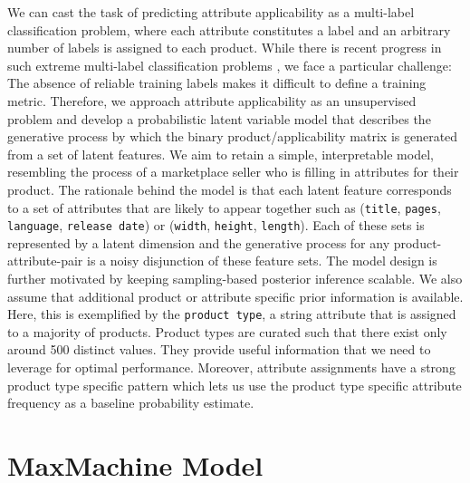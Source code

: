 \documentclass{article}
\begin{document}
We can cast the task of predicting attribute applicability as a
multi-label classification problem, 
where each attribute constitutes a label and an arbitrary number 
of labels is assigned to each product. While there is recent progress
in such extreme multi-label classification problems
\cite{Bhatia2015,Jain2017}, we face a particular challenge:
The absence of reliable training labels makes it difficult to
define a training metric. Therefore, we approach attribute
applicability as an unsupervised problem and develop a probabilistic
latent variable model
that describes the generative process by which the binary
product/applicability matrix is generated from a set of latent
features. We aim to retain a simple,
interpretable model, resembling the process of a marketplace
seller who is filling in attributes for their product.
The rationale behind the model is that each latent
feature corresponds to a set of attributes that are likely to appear
together such as (\texttt{title}, \texttt{pages}, \texttt{language}, \texttt{release date}) or
(\texttt{width}, \texttt{height}, \texttt{length}).
Each of these sets is represented by a latent dimension and the
generative process for any product-attribute-pair is a noisy
disjunction of these feature sets. 
The model design is further motivated by keeping sampling-based
posterior inference scalable.
We also assume that additional product or attribute specific prior
information is available. Here, this is exemplified by the
\texttt{product type}, a string attribute that is assigned to a majority of products. Product types are curated such that there exist only
around 500 distinct values. They provide useful information that we need
to leverage for optimal performance. Moreover, attribute assignments
have a strong product type specific pattern which lets us use the
product type specific attribute frequency as a baseline probability estimate.

\section{MaxMachine Model}
\label{sec:orga18e9af}
\end{document}
